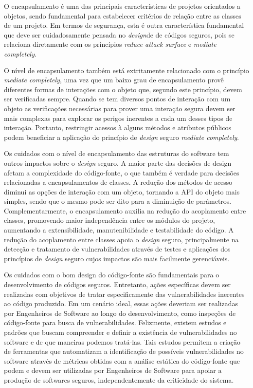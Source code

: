 %

O encapsulamento é uma das principais características de projetos orientados a objetos, sendo fundamental para estabelecer critérios de relação entre as classes de um projeto. Em termos de segurança, esta é outra característica fundamental que deve ser cuidadosamente pensada no \emph{design}de de códigos seguros, pois se relaciona diretamente com os princípios \emph{reduce attack surface} e \emph{mediate completely}.

%



%

O nível de encapsulamento também está extritamente relacionado com o princípio \emph{mediate completely}, uma vez que um baixo grau de encapsulamento provê diferentes formas de interações com o objeto que, segundo este princípio, devem ser verificadas sempre. Quando se tem diversos pontos de interação com um objeto as verificações necessárias para prover uma interação segura devem ser mais complexas para explorar os perigos inerentes a cada um desses tipos de interação. Portanto, restringir acessos à alguns métodos e atributos públicos podem beneficiar a aplicação do princípio de \emph{design} seguro \emph{mediate completely}.

%

Os cuidados com o nível de encapsulamento das estruturas do software tem outros impactos sobre o \emph{design} seguro. A maior parte das decisões de design afetam a complexidade do código-fonte, o que também é verdade para decisões relacionadas a encapsulamentos de classes. A redução dos métodos de acesso diminui as opções de interação com um objeto, tornando a API do objeto mais simples, sendo que o mesmo pode ser dito para a diminuição de parâmetros. Complementarmente, o encapsulamento auxilia na redução do acoplamento entre classes, promovendo maior independência entre os módulos do projeto, aumentando a extensibilidade, manutenibilidade e testabilidade do código. A redução do acoplamento entre classes apoia o \emph{design} seguro, principalmente na detecção e tratamento de vulnerabilidades através de testes e aplicações dos princípios de \emph{design} seguro cujos impactos são mais facilmente gerenciáveis.

%


Os cuidados com o bom design do código-fonte são fundamentais para o desenvolvimento de códigos seguros. Entretanto, ações específicas devem ser realizadas com objetivos de tratar especificamente das vulnerabilidades inerentes ao código produzido. Em um cenário ideal, essas ações deveriam ser realizadas por Engenheiros de Software ao longo do desenvolvimento, como inspeções de código-fonte para busca de vulnerabilidades. Felizmente, existem estudos e padrões que buscam compreender e definir a existência de vulnerabilidades no software e de que maneiras podemos tratá-las. Tais estudos permitem a criação de ferramentas que automatizam a identificação de possíveis vulnerabilidades no software através de métricas obtidas com a análise estática do código-fonte que podem e devem ser utilizadas por Engenheiros de Software para apoiar a produção de softwares seguros, independentemente da criticidade do sistema. 

